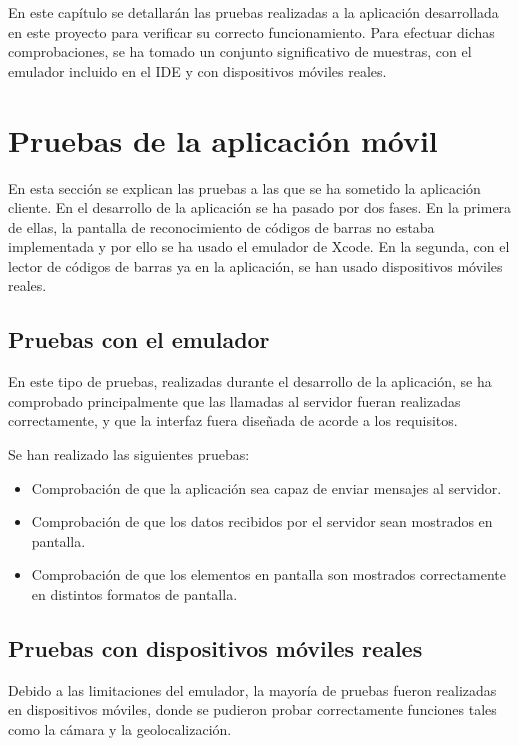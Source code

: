 En este capítulo se detallarán las pruebas realizadas a la aplicación desarrollada en este proyecto para verificar su correcto funcionamiento. Para efectuar dichas comprobaciones, se ha tomado un conjunto significativo de muestras, con el emulador incluido en el IDE y con dispositivos móviles reales.

\section{Pruebas de la aplicación móvil}
En esta sección se explican las pruebas a las que se ha sometido la aplicación cliente. En el desarrollo de la aplicación se ha pasado por dos fases. En la primera de ellas, la pantalla de reconocimiento de códigos de barras no estaba implementada y por ello se ha usado el emulador de Xcode. En la segunda, con el lector de códigos de barras ya en la aplicación, se han usado dispositivos móviles reales.

\subsection{Pruebas con el emulador}
\label{sec:emulador}
En este tipo de pruebas, realizadas durante el desarrollo de la aplicación, se ha comprobado principalmente que las llamadas al servidor fueran realizadas correctamente, y que la interfaz fuera diseñada de acorde a los requisitos.

Se han realizado las siguientes pruebas:

\begin{itemize}
	\item Comprobación de que la aplicación sea capaz de enviar mensajes al servidor.
	\item Comprobación de que los datos recibidos por el servidor sean mostrados en pantalla.
	\item Comprobación de que los elementos en pantalla son mostrados correctamente en distintos formatos de pantalla.
\end{itemize}

\subsection{Pruebas con dispositivos móviles reales}
Debido a las limitaciones del emulador, la mayoría de pruebas fueron realizadas en dispositivos móviles, donde se pudieron probar correctamente funciones tales como la cámara y la geolocalización.

